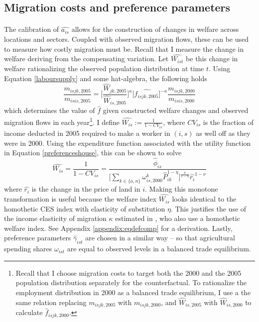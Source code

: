 \documentclass[]{article}
\theoremstyle{plain}
\begin{document}
\subsection*{Migration costs and preference parameters}
\paragraph*{}
The calibration of $\hat{a_{is}}$ allows for the construction of changes in welfare across locations and sectors. Coupled with observed migration flows, these can be used to measure how costly migration must be. Recall that I measure the change in welfare deriving from the compensating variation. Let $\hat{W_{ist}}$ be this change in welfare rationalizing the observed population distribution at time $t$. Using Equation \eqref{laboursupply} and some hat-algebra, the following holds
\begin{equation}
		\frac{m_{isjk, 2005}}{m_{isis, 2005}} = \bigg[\frac{\hat{W}_{jk,2005}}{\hat{W}_{is,2005}}\bigg]^{\kappa} \big[\hat{f_{isjk, 2005}}\big]^{-\kappa} \frac{m_{isjk, 2000}}{m_{isis, 2000}}
\end{equation}
which determines the value of $\hat{f}$ given constructed welfare changes and observed migration flows in each year\footnote{Recall that I choose migration costs to target both the 2000 and the 2005 population distribution separately for the counterfactual. To rationalize the employment distribution in 2000 as a balanced trade equilibrium, I use a the same relation replacing $m_{isjk, 2005}$ with $m_{isjk, 2000}$, and $\hat{W}_{is,2005}$ with $\hat{W}_{is,2000}$ to calculate $\hat{f}_{isjk, 2000}$.}. I define $\hat{W_{is}} := \frac{1}{1-CV_{is}}$, where $CV_{is}$ is the fraction of income deducted in 2005 required to make a worker in $(i, s)$ as well off as they were in 2000. Using the expenditure function associated with the utility function in Equation \eqref{preferenceshouse}, this can be shown to solve  
\begin{equation}
	\hat{W_{is}} = \frac{1}{1 - CV_{is}} = \frac{\hat{\phi}_{is}}{\bigg[\sum_{k \in \{a, n\}}\omega_{is, 2000}^{k}\hat{P}_{ik}^{1-\eta}\bigg]^{\frac{\nu}{1-\eta}}\hat{r_{i}}^{1-\nu}}
\end{equation}
where $\hat{r_{i}}$ is the change in the price of land in $i$. Making this monotone transformation is useful because the welfare index $\hat{W_{is}}$ looks identical to the homothetic CES index with elasticity of substitution $\eta$. This justifies the use of the income elasticity of migration $\kappa$ estimated in \cite{tombezhu}, who also use a homothetic welfare index. See Appendix \ref{appendix:eqdefcomp} for a derivation. Lastly, preference parameters $\hat{\gamma}_{ist}$ are chosen in a similar way -- so that agricultural spending shares $\omega_{ist}$ are equal to observed levels in a balanced trade equilibrium.
\end{document}
